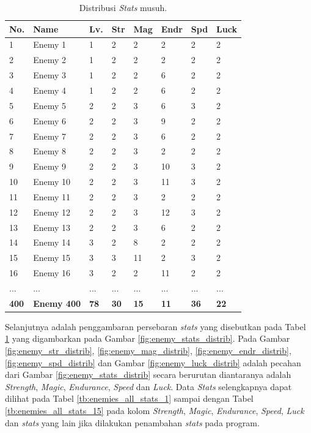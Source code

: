 \begin{longtable}{|l|l|l|l|l|l|l|l|}
	\caption{Distribusi \textit{Stats} musuh.}
	\label{tb:enemy_stats}\\
	\hline
	\rowcolor[HTML]{C0C0C0} 
	\textbf{No.} & \textbf{Name} & \textbf{Lv.} & \textbf{Str} & \textbf{Mag} & \textbf{Endr} & \textbf{Spd} & \textbf{Luck} \\ \hline
	1 & Enemy 1 & 1 & 2 & 2 & 2 & 2 & 2 \\ \hline
	2 & Enemy 2 & 1 & 2 & 2 & 2 & 2 & 2 \\ \hline
	3 & Enemy 3 & 1 & 2 & 2 & 6 & 2 & 2 \\ \hline
	4 & Enemy 4 & 1 & 2 & 2 & 6 & 2 & 2 \\ \hline
	5 & Enemy 5 & 2 & 2 & 3 & 6 & 3 & 2 \\ \hline
	6 & Enemy 6 & 2 & 2 & 3 & 9 & 2 & 2 \\ \hline
	7 & Enemy 7 & 2 & 2 & 3 & 6 & 2 & 2 \\ \hline
	8 & Enemy 8 & 2 & 2 & 3 & 2 & 2 & 2 \\ \hline
	9 & Enemy 9 & 2 & 2 & 3 & 10 & 3 & 2 \\ \hline
	10 & Enemy 10 & 2 & 2 & 3 & 11 & 3 & 2 \\ \hline
	11 & Enemy 11 & 2 & 2 & 3 & 2 & 2 & 2 \\ \hline
	12 & Enemy 12 & 2 & 2 & 3 & 12 & 3 & 2 \\ \hline
	13 & Enemy 13 & 2 & 2 & 3 & 6 & 2 & 2 \\ \hline
	14 & Enemy 14 & 3 & 2 & 8 & 2 & 2 & 2 \\ \hline
	15 & Enemy 15 & 3 & 3 & 11 & 2 & 3 & 2 \\ \hline
	16 & Enemy 16 & 3 & 2 & 2 & 11 & 2 & 2 \\ \hline
	... & ... & ... & ... & ... & ... & ... & ... \\ \hline
	\textbf{400} & \textbf{Enemy 400} & \textbf{78} & \textbf{30} & \textbf{15} & \textbf{11} & \textbf{36} & \textbf{22} \\ \hline
\end{longtable}
\vspace{1ex}

Selanjutnya adalah penggambaran persebaran \textit{stats} yang disebutkan pada Tabel \ref{tb:enemy_stats} yang digambarkan pada Gambar \ref{fig:enemy_stats_distrib}. Pada Gambar \ref{fig:enemy_str_distrib}, \ref{fig:enemy_mag_distrib}, \ref{fig:enemy_endr_distrib}, \ref{fig:enemy_spd_distrib} dan Gambar \ref{fig:enemy_luck_distrib} adalah pecahan dari Gambar \ref{fig:enemy_stats_distrib} secara berurutan diantaranya adalah \textit{Strength}, \textit{Magic}, \textit{Endurance}, \textit{Speed} dan \textit{Luck}. Data \textit{Stats} selengkapnya dapat dilihat pada Tabel \ref{tb:enemies_all_stats_1} sampai dengan Tabel \ref{tb:enemies_all_stats_15} pada kolom \textit{Strength}, \textit{Magic}, \textit{Endurance}, \textit{Speed}, \textit{Luck} dan \textit{stats} yang lain jika dilakukan penambahan \textit{stats} pada program. 
\vspace{1ex}

